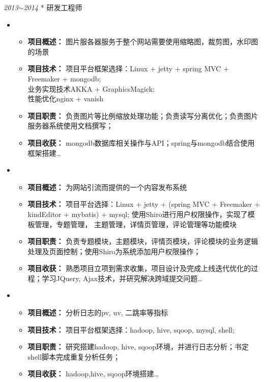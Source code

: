 \documentclass[line,margin]{res}
\begin{document}
\begin{resume}
\begin{itemize}
\end{itemize}

 {\sl 2013$\sim$2014} \hfill ** \hfill 研发工程师 \\
\begin{itemize}
\item {} \\
    \begin{itemize}
		\item {\bf 项目概述：} 图片服各器服务于整个网站需要使用缩略图，裁剪图，水印图的场景
		\item {\bf 项目技术：} 项目平台框架选择：Linux + jetty + spring MVC + Freemaker + mongodb; \\
		 业务实现技术AKKA + GraphicsMagick; \\
		 性能优化nginx + vanish
        \item {\bf 项目职责：} 负责图片等比例缩放处理功能；负责读写分离优化；负责图片服务器系统使用文档撰写；
		\item {\bf 项目收获：} mongodb数据库相关操作与API；spring与mongodb结合使用框架搭建\ldots 
	\end{itemize}			

\item {} \\
    \begin{itemize}
		\item {\bf 项目概述：} 为网站引流而提供的一个内容发布系统
		\item {\bf 项目技术：} 项目平台选择：Linux + jetty + (spring MVC + Freemaker + kindEditor + mybatis) + mysql; 使用Shiro进行用户权限操作，实现了模板管理，专题管理， 主题管理，详情页管理，评论管理等功能模块
        \item {\bf 项目职责：} 负责专题模块，主题模块，评情页模块，评论模块的业务逻辑处理及页面控制；使用Shiro为系统添加用户权限操作；
		\item {\bf 项目收获：} 熟悉项目立项到需求收集，项目设计及完成上线迭代优化的过程；学习JQuery, Ajax技术，并研究解决跨域提交问题\ldots 
	\end{itemize}	

\item {} \\
    \begin{itemize}
		\item {\bf 项目概述：} 分析日志的pv, uv, 二跳率等指标
		\item {\bf 项目技术：} 项目平台框架选择：hadoop, hive, sqoop, mysql, shell; \\
        \item {\bf 项目职责：} 研究搭建hadoop, hive, sqoop环境，并进行日志分析；书定shell脚本完成重复分析任务；
		\item {\bf 项目收获：} hadoop,hive, sqoop环境搭建\ldots 
	\end{itemize}	


\end{itemize}
\end{resume}
\end{document}
